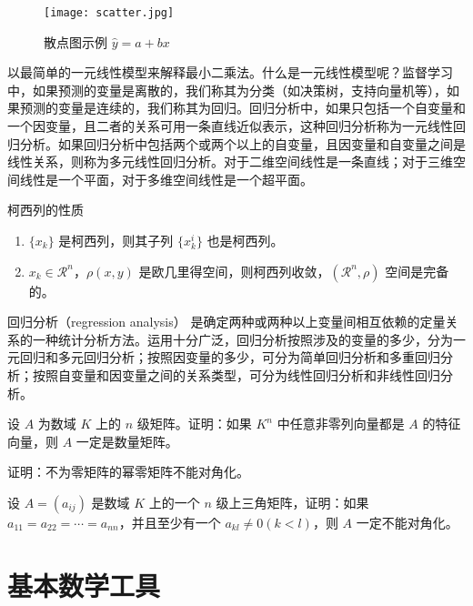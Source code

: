 \documentclass[lang=cn,newtx,10pt,scheme=chinese]{elegantbook}
\begin{document}
\begin{figure}[htbp]
  \centering
  \texttt{[image: scatter.jpg]}
  \caption{散点图示例 $\hat{y}=a+bx$ \label{fig:scatter}}
\end{figure}

以最简单的一元线性模型来解释最小二乘法。什么是一元线性模型呢？监督学习中，如果预测的变量是离散的，我们称其为分类（如决策树，支持向量机等），如果预测的变量是连续的，我们称其为回归。回归分析中，如果只包括一个自变量和一个因变量，且二者的关系可用一条直线近似表示，这种回归分析称为一元线性回归分析。如果回归分析中包括两个或两个以上的自变量，且因变量和自变量之间是线性关系，则称为多元线性回归分析。对于二维空间线性是一条直线；对于三维空间线性是一个平面，对于多维空间线性是一个超平面。

\begin{property}\label{property:cauchy}
柯西列的性质
\begin{enumerate}
\item $\{x_k\}$ 是柯西列，则其子列 $\{x_k^i\}$ 也是柯西列。
\item $x_k\in \mathcal{R}^n$，$\rho(x,y)$ 是欧几里得空间，则柯西列收敛，$(\mathcal{R}^n,\rho)$ 空间是完备的。
\end{enumerate}
\end{property}

\begin{conclusion}
回归分析（regression analysis） 是确定两种或两种以上变量间相互依赖的定量关系的一种统计分析方法。运用十分广泛，回归分析按照涉及的变量的多少，分为一元回归和多元回归分析；按照因变量的多少，可分为简单回归分析和多重回归分析；按照自变量和因变量之间的关系类型，可分为线性回归分析和非线性回归分析。
\end{conclusion}

\begin{problemset}
\item 设 $A$ 为数域 $K$ 上的 $n$ 级矩阵。证明：如果 $K^n$ 中任意非零列向量都是 $A$ 的特征向量，则 $A$ 一定是数量矩阵。
\item 证明：不为零矩阵的幂零矩阵不能对角化。
\item 设 $A = (a_{ij})$ 是数域 $K$ 上的一个 $n$ 级上三角矩阵，证明：如果 $a_{11} = a_{22} = \cdots = a_{nn}$，并且至少有一个 $a_{kl} \not = 0 (k < l)$，则 $A$ 一定不能对角化。
\end{problemset}


\nocite{*}
\printbibliography[heading=bibintoc, title=\ebibname]
\appendix

\chapter{基本数学工具}
\end{document}
